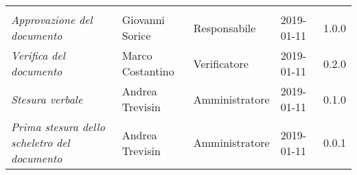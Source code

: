 \newpage 
\section*{}
\begin{table}[H]
	\centering
	\begin{tabular}{p{4cm}|C{3cm}|C{3cm}|R{2.5cm}|R{2cm}}
		
		 & & & & \\
		
		
		\emph{Approvazione del documento} & Giovanni Sorice & Responsabile & 2019-01-11 & 1.0.0 \\
		\hline
		
		\emph{Verifica del documento} & Marco Costantino & Verificatore & 2019-01-11 & 0.2.0 \\
		\hline

		\emph{Stesura verbale} & Andrea Trevisin & Amministratore & 2019-01-11 & 0.1.0 \\
		\hline
		
		\emph{Prima stesura dello scheletro del documento} & Andrea Trevisin & Amministratore & 2019-01-11 & 0.0.1 \\
		
	\end{tabular}
	
\end{table}


\clearpage